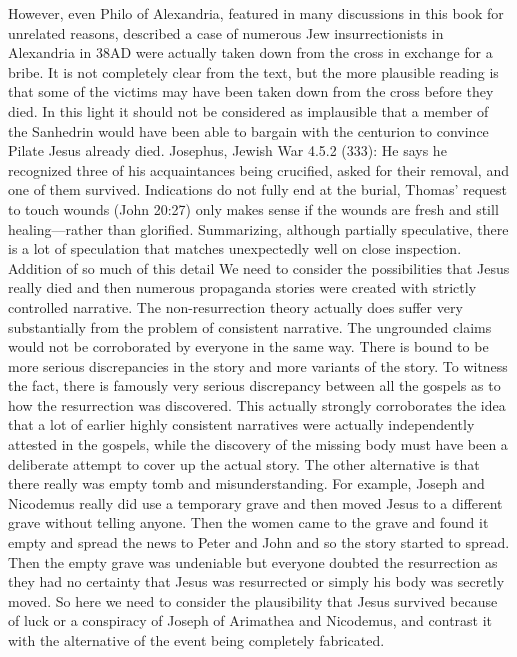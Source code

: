 However, even Philo of Alexandria, featured in many discussions in this book for unrelated reasons, described a case of numerous Jew insurrectionists in Alexandria in 38AD were actually taken down from the cross in exchange for a bribe.
It is not completely clear from the text, but the more plausible reading is that some of the victims may have been taken down from the cross before they died.
In this light it should not be considered as implausible that a member of the Sanhedrin would have been able to bargain with the centurion to convince Pilate Jesus already died.
Josephus, Jewish War 4.5.2 (333): He says he recognized three of his acquaintances being crucified, asked for their removal, and one of them survived.
Indications do not fully end at the burial, Thomas’ request to touch wounds (John 20:27) only makes sense if the wounds are fresh and still healing—rather than glorified.
Summarizing, although partially speculative, there is a lot of speculation that matches unexpectedly well on close inspection.
Addition of so much of this detail We need to consider the possibilities that Jesus really died and then numerous propaganda stories were created with strictly controlled narrative.
The non-resurrection theory actually does suffer very substantially from the problem of consistent narrative.
The ungrounded claims would not be corroborated by everyone in the same way.
There is bound to be more serious discrepancies in the story and more variants of the story.
To witness the fact, there is famously very serious discrepancy between all the gospels as to how the resurrection was discovered.
This actually strongly corroborates the idea that a lot of earlier highly consistent narratives were actually independently attested in the gospels, while the discovery of the missing body must have been a deliberate attempt to cover up the actual story.
The other alternative is that there really was empty tomb and misunderstanding.
For example, Joseph and Nicodemus really did use a temporary grave and then moved Jesus to a different grave without telling anyone.
Then the women came to the grave and found it empty and spread the news to Peter and John and so the story started to spread.
Then the empty grave was undeniable but everyone doubted the resurrection as they had no certainty that Jesus was resurrected or simply his body was secretly moved.
So here we need to consider the plausibility that Jesus survived because of luck or a conspiracy of Joseph of Arimathea and Nicodemus, and contrast it with the alternative of the event being completely fabricated.

